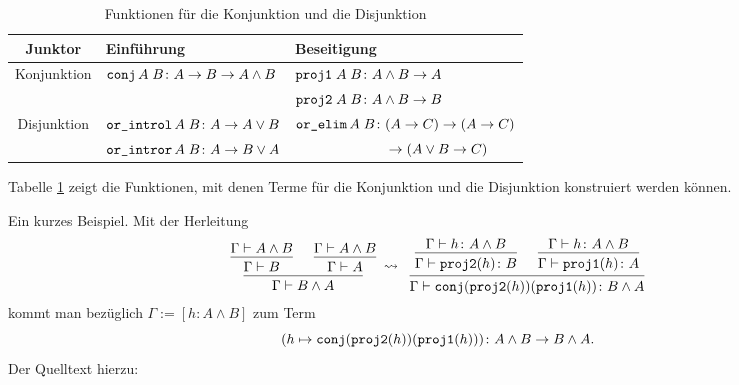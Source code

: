 \begin{table}
\begin{center}
\caption{Funktionen für die Konjunktion und die Disjunktion}
\label{tab:Funktionen-Konjunktion-Disjunktion}
\begin{tabular}{@{}cll@{}}
\toprule
\textbf{Junktor} & \textbf{Einführung} & \textbf{Beseitigung}\\
\midrule[\heavyrulewidth]
Konjunktion & $\texttt{conj}\,A\;B\colon A \to B \to A\land B$
& $\texttt{proj1}\;A\;B\colon A\land B\to A$\\
& & $\texttt{proj2}\;A\;B\colon A\land B\to B$\\
\midrule[\heavyrulewidth]
Disjunktion & $\texttt{or\_introl}\,A\;B\colon A\to A\lor B$
& $\texttt{or\_elim}\,A\;B\colon (A\to C)\to (A\to C)$\\
& $\texttt{or\_intror}\,A\;B\colon A\to B\lor A$
& $\phantom{\code{or\_elim}\,A\;B\colon}\to (A\lor B\to C)$\\
\bottomrule
\end{tabular}
\end{center}
\end{table}

\noindent
Tabelle \ref{tab:Funktionen-Konjunktion-Disjunktion} zeigt die Funktionen,
mit denen Terme für die Konjunktion und die Disjunktion konstruiert
werden können.

Ein kurzes Beispiel. Mit der Herleitung
\[\begin{prooftree}
    \hypo{\Gamma\vdash A\land B}
  \infer1{\Gamma\vdash B}
    \hypo{\Gamma\vdash A\land B}
  \infer1{\Gamma\vdash A}
\infer2{\Gamma\vdash B\land A}
\end{prooftree}
\;\rightsquigarrow\;\;
\begin{prooftree}
    \hypo{\Gamma\vdash h\colon A\land B}
  \infer1{\Gamma\vdash\code{proj2}(h)\colon B}
    \hypo{\Gamma\vdash h\colon A\land B}
  \infer1{\Gamma\vdash\code{proj1}(h)\colon A}
\infer2{\Gamma\vdash\code{conj} (\code{proj2}(h)) (\code{proj1}(h))\colon B\land A}
\end{prooftree}\]
kommt man bezüglich $\Gamma:=[h\colon A\land B]$ zum Term
\[(h\mapsto\texttt{conj} (\texttt{proj2}(h)) (\texttt{proj1}(h)))\colon A\land B\to B\land A.\]
Der Quelltext hierzu:

